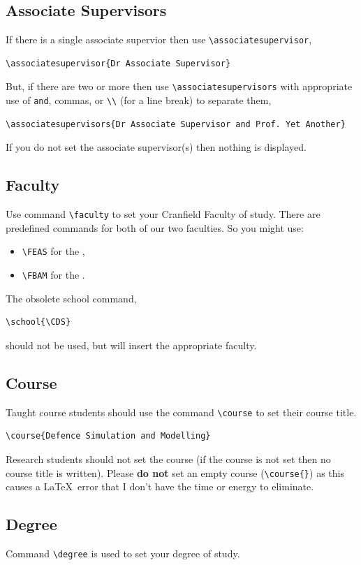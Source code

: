 \documentclass[12pt,oneside]{book} %
\begin{document}
\subsection{Associate Supervisors}
\label{sec:AssociateSupervisor}
If there is a single associate supervior then use \verb#\associatesupervisor#,
\begin{verbatim}
\associatesupervisor{Dr Associate Supervisor}
\end{verbatim}
But, if there are two or more then use \verb#\associatesupervisors# with appropriate use of {\tt and}, commas, or \verb#\\# (for a line break)  to separate them,
\begin{verbatim}
\associatesupervisors{Dr Associate Supervisor and Prof. Yet Another}
\end{verbatim}
If you do not set the associate supervisor(s) then nothing is displayed.

\subsection{Faculty}
\label{sec:Faculty} 
Use command \verb#\faculty# to set your Cranfield Faculty of study. There are predefined commands for both of our two faculties. So you might use:
	\begin{itemize}
	\item \verb#\FEAS# for the \FEAS, 
	\item \verb#\FBAM# for the \FBAM.
	\end{itemize}
The obsolete school command, \eg
\begin{verbatim}
\school{\CDS}
\end{verbatim}
should not be used, but will insert the appropriate faculty.

\subsection{Course}
\label{sec:Course}
Taught course students should use the command \verb#\course# to set their course title. \eg
\begin{verbatim}
\course{Defence Simulation and Modelling}
\end{verbatim}
Research students should not set the course (if the course is not set then no course title is written). Please \textbf{do not} set an empty course (\verb#\course{}#) as this causes a \LaTeX\ error that I don't have the time or energy to eliminate.

\subsection{Degree}
\label{sec:degree}
Command \verb#\degree# is used to set your degree of study. 
\end{document}
